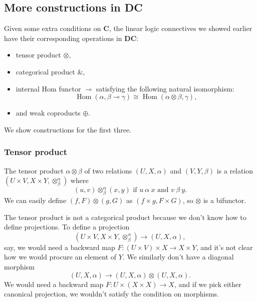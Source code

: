 \documentclass[a4paper]{article}
\newcommand{\DC}{\textbf{DC}}
\newcommand{\C}{\textbf{C}}
\DeclareMathOperator{\Hom}{Hom}
\begin{document}
\subsection{More constructions in \DC}
Given some extra conditions on \C{}, the linear logic connectives we showed earlier have their corresponding operations in \textbf{DC}: 
\begin{itemize}
    \item tensor product $\otimes$,
    \item categorical product $\&$,
    \item internal Hom functor $\multimap$ satisfying the following natural isomorphism:
    \begin{equation*}
        \Hom(\alpha,\beta\multimap\gamma)\cong \Hom(\alpha \otimes \beta, \gamma),
    \end{equation*}
    \item and weak coproducts $\oplus$.
\end{itemize}
We show constructions for the first three.

\subsubsection{Tensor product}
The tensor product $\alpha\otimes\beta$ of two relations $(U,X,\alpha)$ and $(V,Y,\beta)$ is a relation $(U \times V,X\times Y,\otimes^\alpha_\beta)$ where 
\begin{equation*}
    (u,v)\otimes^\alpha_\beta (x,y)\text{ if } u\ \alpha\ x\text{ and } v\ \beta\ y.
\end{equation*}
We can easily define $(f,F)\otimes (g,G)$ as $(f\times g, F\times G)$, so $\otimes$ is a bifunctor. 

The tensor product is not a categorical product because we don't know how to define projections. To define a projection 
\begin{equation*}
    (U\times V,X\times Y,\otimes^\alpha_\beta)\to (U,X,\alpha),
\end{equation*}
say, we would need a backward map $F:(U\times V)\times X\to X\times Y$, and it's not clear how we would procure an element of $Y$. 
We similarly don't have a diagonal morphism
\begin{equation*}
    (U,X,\alpha)\to (U,X,\alpha)\otimes (U,X,\alpha).
\end{equation*}
We would need a backward map $F:U\times (X\times X)\to X$, and if we pick either canonical projection, we wouldn't satisfy the condition on morphisms. 
\end{document}
